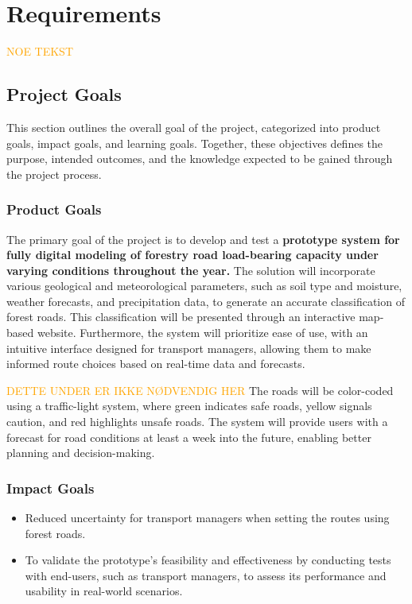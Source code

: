 \chapter{Requirements}

\textcolor{orange}{NOE TEKST}

\section{Project Goals}

This section outlines the overall goal of the project, categorized into product goals, impact goals, and learning goals. Together, these objectives defines the purpose, intended outcomes, and the knowledge expected to be gained through the project process.

\subsection{Product Goals}

The primary goal of the project is to develop and test a \textbf{prototype system for fully digital modeling of forestry road load-bearing capacity under varying conditions throughout the year.} The solution will incorporate various geological and meteorological parameters, such as soil type and moisture, weather forecasts, and precipitation data, to generate an accurate classification of forest roads. This classification will be presented through an interactive map-based website. Furthermore, the system will prioritize ease of use, with an intuitive interface designed for transport managers, allowing them to make informed route choices based on real-time data and forecasts. 

\textcolor{orange}{DETTE UNDER ER IKKE NØDVENDIG HER}
The roads will be color-coded using a traffic-light system, where green indicates safe roads, yellow signals caution, and red highlights unsafe roads. The system will provide users with a forecast for road conditions at least a week into the future, enabling better planning and decision-making. 

\subsection{Impact Goals}
\begin{itemize}
    \item Reduced uncertainty for transport managers when setting the routes using forest roads.
    \item To validate the prototype's feasibility and effectiveness by conducting tests with end-users, such as transport managers, to assess its performance and usability in real-world scenarios.
\end{itemize}


